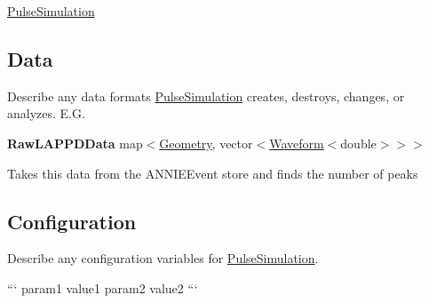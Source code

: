 \hyperlink{classPulseSimulation}{Pulse\-Simulation}

\subsection*{Data}

Describe any data formats \hyperlink{classPulseSimulation}{Pulse\-Simulation} creates, destroys, changes, or analyzes. E.\-G.

{\bfseries Raw\-L\-A\-P\-P\-D\-Data} {\ttfamily map$<$\hyperlink{classGeometry}{Geometry}, vector$<$\hyperlink{classWaveform}{Waveform}$<$double$>$$>$$>$}
\begin{DoxyItemize}
\item Takes this data from the {\ttfamily A\-N\-N\-I\-E\-Event} store and finds the number of peaks
\end{DoxyItemize}

\subsection*{Configuration}

Describe any configuration variables for \hyperlink{classPulseSimulation}{Pulse\-Simulation}.

``` param1 value1 param2 value2 ``` 